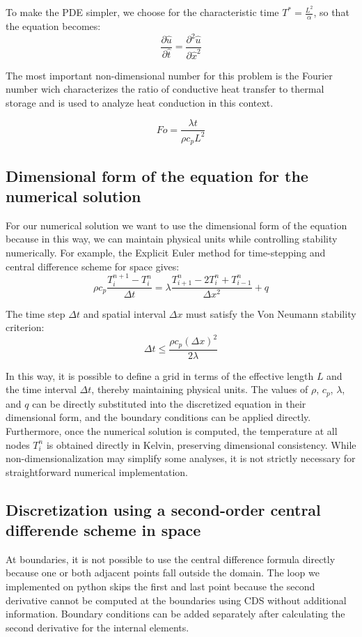 \documentclass{article}
\begin{document}
To make the PDE simpler, we choose for the characteristic time \( T^* = \frac{L^2}{\alpha}\), so that the equation becomes:
\[
\frac{\partial \hat{u}}{\partial \hat{t}} = \frac{\partial^2 \hat{u}}{\partial \hat{x}^2}
\]

The most important non-dimensional number for this problem is the Fourier number wich characterizes 
the ratio of conductive heat transfer to thermal storage and is used to analyze heat conduction in this context.

\[
Fo = \frac{\lambda t}{\rho c_p L^2}
\]

\subsection{Dimensional form of the equation for the numerical solution}

For our numerical solution we want to use the dimensional form of the equation because in this way, we can maintain physical units while 
controlling stability numerically. For example, the Explicit Euler method for time-stepping and central difference scheme for space gives:
\[
\rho c_p \frac{T_i^{n+1} - T_i^n}{\Delta t} = \lambda \frac{T_{i+1}^n - 2T_i^n + T_{i-1}^n}{\Delta x^2} + q
\]

The time step $\Delta t$ and spatial interval $\Delta x$ must satisfy the Von Neumann stability criterion:
\[
\Delta t \leq \frac{\rho c_p (\Delta x)^2}{2 \lambda}
\]

In this way, it is possible to define a grid in terms of the effective length $L$ and the time interval $\Delta t$, 
thereby maintaining physical units. The values of $\rho$, $c_p$, $\lambda$, and $q$ can be directly substituted into 
the discretized equation in their dimensional form, and the boundary conditions can be applied directly. Furthermore,
once the numerical solution is computed, the temperature at all nodes $T_i^n$ is obtained directly in Kelvin, preserving
dimensional consistency. While non-dimensionalization may simplify some analyses, it is not strictly necessary for straightforward 
numerical implementation.

\subsection{Discretization using a second-order central differende scheme in space}

At boundaries, it is not possible to use the central difference formula directly because one or both adjacent points fall outside the domain.
The loop we implemented on python skips the first and last point because the second derivative cannot be computed at the boundaries using CDS
without additional information. Boundary conditions can be added separately after calculating the second derivative for the internal elements.
\end{document}
